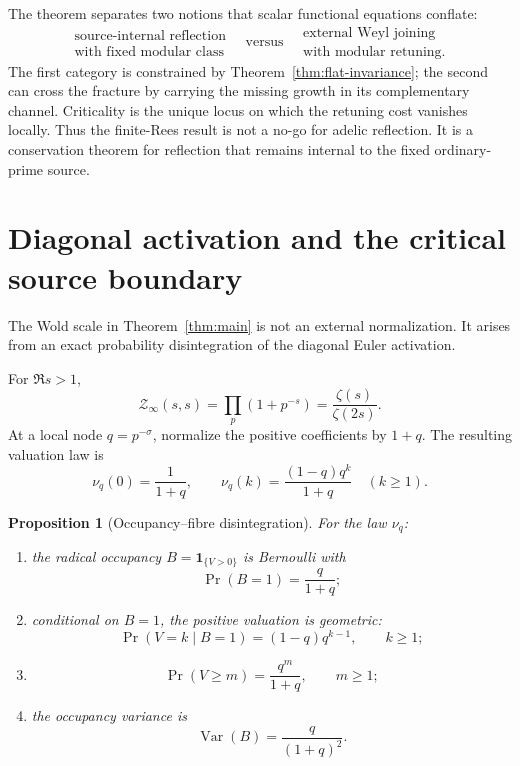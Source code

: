 \documentclass[11pt]{article}
\newtheorem{proposition}[theorem]{Proposition}
\theoremstyle{definition}
\theoremstyle{remark}
\newcommand{\cZ}{\mathcal Z}
\begin{document}
The theorem separates two notions that scalar functional equations conflate:
\[
 \boxed{\quad
 \begin{array}{c}
 \text{source-internal reflection}\\[-1mm]
 \text{with fixed modular class}
 \end{array}
 \quad\text{versus}\quad
 \begin{array}{c}
 \text{external Weyl joining}\\[-1mm]
 \text{with modular retuning}.
 \end{array}
 \quad}
 \tag{5.6}\label{eq:reflection-categories}
\]
The first category is constrained by Theorem~\ref{thm:flat-invariance}; the second can cross the
fracture by carrying the missing growth in its complementary channel.  Criticality is the unique
locus on which the retuning cost vanishes locally.  Thus the finite-Rees result is not a no-go
for adelic reflection.  It is a conservation theorem for reflection that remains internal to
the fixed ordinary-prime source.

\section{Diagonal activation and the critical source boundary}\label{sec:activation}

The Wold scale in Theorem~\ref{thm:main} is not an external normalization.  It arises from an
exact probability disintegration of the diagonal Euler activation.

For \(\Re s>1\),
\[
 \cZ_\infty(s,s)=\prod_p(1+p^{-s})
 =\frac{\zeta(s)}{\zeta(2s)}.
 \tag{6.1}\label{eq:diagonal-activation}
\]
At a local node \(q=p^{-\sigma}\), normalize the positive coefficients by \(1+q\).
The resulting valuation law is
\[
 \nu_q(0)=\frac1{1+q},
 \qquad
 \nu_q(k)=\frac{(1-q)q^k}{1+q}\quad(k\geq1).
 \tag{6.2}\label{eq:activation-law}
\]

\begin{proposition}[Occupancy--fibre disintegration]\label{prop:disintegration}
For the law \(\nu_q\):
\begin{enumerate}[label=\textup{(\roman*)}]
\item the radical occupancy \(B=\mathbf1_{\{V>0\}}\) is Bernoulli with
\[
 \Pr(B=1)=\frac q{1+q};
 \tag{6.3}\label{eq:occupancy}
\]
\item conditional on \(B=1\), the positive valuation is geometric:
\[
 \Pr(V=k\mid B=1)=(1-q)q^{k-1},\qquad k\geq1;
 \tag{6.4}\label{eq:conditional-geometric}
\]
\item
\[
 \Pr(V\geq m)=\frac{q^m}{1+q},\qquad m\geq1;
 \tag{6.5}\label{eq:valuation-tail}
\]
\item the occupancy variance is
\[
 \operatorname{Var}(B)=\frac q{(1+q)^2}.
 \tag{6.6}\label{eq:fisher-variance}
\]
\end{enumerate}
\end{proposition}
\end{document}
